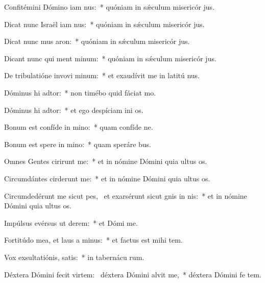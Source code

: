 \item Confitémini Dómino iam nus:~* quóniam in sǽculum misericór jus.
\item Dicat nunc Israël iam nus:~* quóniam in sǽculum misericór jus.
\item Dicat nunc mus aron:~* quóniam in sǽculum misericór jus.
\item Dicant nunc qui ment minum:~* quóniam in sǽculum misericór jus.
\item De tribulatióne invovi minum:~* et exaudívit me in latitú nus.
\item Dóminus hi adtor:~* non timébo quid fáciat  mo.
\item Dóminus hi adtor:~* et ego despíciam ini os.
\item Bonum est confíde in mino:~* quam confíde  ne.
\item Bonum est spere in mino:~* quam speráre  bus.
\item Omnes Gentes cirirunt me:~* et in nómine Dómini quia ultus   os.
\item Circumdántes cirderunt me:~* et in nómine Dómini quia ultus   os.
\item Circumdedérunt me sicut pes,~\pscross{} et exarsérunt sicut gnis in nis:~* et in nómine Dómini quia ultus   os.
\item Impúlsus evérsus  ut derem:~* et Dómi  me.
\item Fortitúdo mea, et laus a minus:~* et factus est mihi  tem.
\item Vox exsultatiónis,  satis:~* in tabernácu rum.
\item Déxtera Dómini fecit virtem:~\pscross{} déxtera Dómini alvit me,~* déxtera Dómini fe tem.
